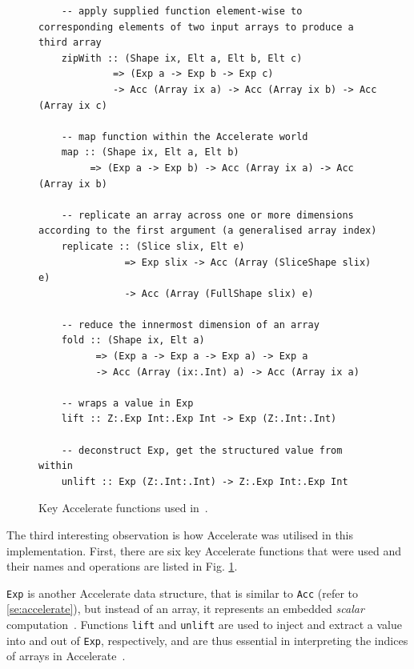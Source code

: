 \begin{figure}
  \begin{lstlisting}
    -- apply supplied function element-wise to corresponding elements of two input arrays to produce a third array 
    zipWith :: (Shape ix, Elt a, Elt b, Elt c)
             => (Exp a -> Exp b -> Exp c)
             -> Acc (Array ix a) -> Acc (Array ix b) -> Acc (Array ix c)

	-- map function within the Accelerate world
    map :: (Shape ix, Elt a, Elt b)
         => (Exp a -> Exp b) -> Acc (Array ix a) -> Acc (Array ix b)
    
    -- replicate an array across one or more dimensions according to the first argument (a generalised array index)
    replicate :: (Slice slix, Elt e)
               => Exp slix -> Acc (Array (SliceShape slix) e)
               -> Acc (Array (FullShape slix) e)
    
    -- reduce the innermost dimension of an array
    fold :: (Shape ix, Elt a)
          => (Exp a -> Exp a -> Exp a) -> Exp a
          -> Acc (Array (ix:.Int) a) -> Acc (Array ix a)
          
    -- wraps a value in Exp
    lift :: Z:.Exp Int:.Exp Int -> Exp (Z:.Int:.Int)
    
    -- deconstruct Exp, get the structured value from within
    unlift :: Exp (Z:.Int:.Int) -> Z:.Exp Int:.Exp Int
  \end{lstlisting}
  \caption{Key Accelerate functions used in~\cite{Eve16}.}
  \label{fig:acc-functions2}
\end{figure}

The third interesting observation is how Accelerate was utilised in this implementation. First, there are six key Accelerate functions that were used and their names and operations are listed in Fig. \ref{fig:acc-functions2}. 

\texttt{Exp} is another Accelerate data structure, that is similar to \texttt{Acc} (refer to \ref{se:accelerate}), but instead of an array, it represents an embedded \textit{scalar} computation~\cite{ChaKelLee11}. Functions \texttt{lift} and \texttt{unlift} are used to inject and extract a value into and out of \texttt{Exp}, respectively, and are thus essential in interpreting the indices of arrays in Accelerate~\cite{Mar13}. 

